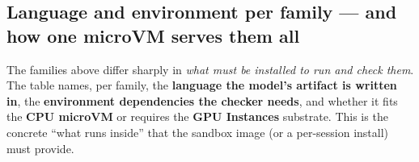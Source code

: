 \documentclass[
  paper=a4,
  ,captions=tableheading
]{scrartcl}
\begin{document}
\hypertarget{language-and-environment-per-family-and-how-one-microvm-serves-them-all}{%
\subsection{Language and environment per family --- and how one microVM
serves them
all}\label{language-and-environment-per-family-and-how-one-microvm-serves-them-all}}

The families above differ sharply in \emph{what must be installed to run
and check them}. The table names, per family, the \textbf{language the
model's artifact is written in}, the \textbf{environment dependencies
the checker needs}, and whether it fits the \textbf{CPU microVM} or
requires the \textbf{GPU Instances} substrate. This is the concrete
``what runs inside'' that the sandbox image (or a per-session install)
must provide.
\end{document}
